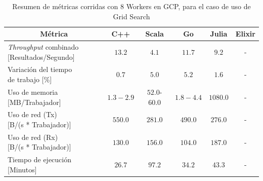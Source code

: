 \documentclass[11pt]{article}
\providecommand{\row}[1]{\parbox{150pt}{\setlength{\baselineskip}{0.2\baselineskip}\strut#1\strut}}
\newcommand{\english}[1]{\textit{#1}}
\begin{document}
\begin{table}[H]
\centering
\begin{tabular}{|l|c|c|c|c|c|}
\hline
\multicolumn{1}{|c|}{Métrica} & C++ & Scala & Go & Julia & Elixir \\ \hline
\row{\english{Throughput} combinado\\{[Resultados/Segundo]}} & $13.2$ & $4.1$ & $11.7$ & $9.2$ & - \\ \hline
\row{Variación del tiempo \\ de trabajo {[}\%{]}} & $0.7$ & $5.0$ & $5.2$ & $1.6$ & - \\ \hline
\row{Uso de memoria \\ {[}MB/Trabajador{]}} & $1.3-2.9$ & $52.0$-$60.0$ & $1.8-4.4$ & $1080.0$ & - \\ \hline
\row{Uso de red (Tx)\\ {[}B/(s * Trabajador){]}} & $550.0$ & $281.0$ & $490.0$ & $276.0$ & - \\ \hline
\row{Uso de red (Rx)\\ {[}B/(s * Trabajador){]}} & $130.0$ & $156.0$ & $104.0$ & $187.0$ & - \\ \hline
Tiempo de ejecución {[}Minutos{]} & $26.7$ & $97.2$ & $34.2$ & $43.3$ & - \\ \hline
\end{tabular}
\caption{Resumen de métricas corridas con 8 Workers en GCP, para el caso de uso de Grid Search}
\label{tab:gs:image_sizes}
\end{table}
\end{document}

